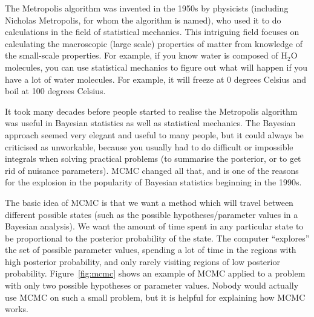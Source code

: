 The Metropolis algorithm was invented in the 1950s by physicists
(including Nicholas Metropolis, for whom the algorithm is named), who used it
to do calculations in the field of statistical mechanics. This intriguing field
focuses on calculating the macroscopic (large scale) properties of matter from
knowledge of the small-scale properties. For example, if you know water is
composed of H$_2$O molecules, you can use statistical mechanics to figure out
what will happen if you have a lot
of water molecules. For example, it will freeze at 0 degrees Celsius and boil at 100 degrees Celsius.

It took
many decades before people started to realise the Metropolis algorithm was
useful in Bayesian
statistics as well as statistical mechanics. The Bayesian approach
seemed very elegant and
useful to many people, but it could always be criticised as unworkable,
because you usually had to do difficult or
impossible integrals when solving practical problems
(to summarise the posterior, or to get rid of nuisance
parameters). MCMC changed all that, and is one of the reasons for the
explosion in the popularity of Bayesian statistics beginning in the 1990s.

The basic idea of MCMC is that we want a method which will travel between
different possible states (such as the possible hypotheses/parameter values in
a Bayesian analysis). We want the amount of time spent in
any particular state to be proportional to the posterior probability of the state.
The computer ``explores'' the set of possible parameter values, spending a lot
of time in the regions with high posterior probability, and only rarely visiting regions
of low posterior probability. Figure~\ref{fig:mcmc} shows an example of MCMC
applied to a problem with only two possible hypotheses or parameter values.
Nobody would actually use MCMC on such a small problem, but it is helpful for
explaining how MCMC works.

